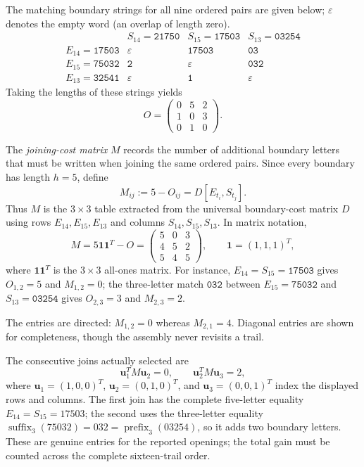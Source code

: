 \documentclass[11pt]{article}
\begin{document}
The matching boundary strings for all nine ordered pairs are given
below; $\varepsilon$ denotes the empty word (an overlap of length zero).
\[
\begin{array}{c|ccc}
  & S_{14}=\texttt{21750} & S_{15}=\texttt{17503} & S_{13}=\texttt{03254}\\\hline
E_{14}=\texttt{17503}&\varepsilon&\texttt{17503}&\texttt{03}\\
E_{15}=\texttt{75032}&\texttt{2}&\varepsilon&\texttt{032}\\
E_{13}=\texttt{32541}&\varepsilon&\texttt{1}&\varepsilon
\end{array}
\]
Taking the lengths of these strings yields
\[
O=\begin{pmatrix}0&5&2\\1&0&3\\0&1&0\end{pmatrix}.
\]

The \emph{joining-cost matrix} $M$ records the number of additional
boundary letters that must be written when joining the same ordered
pairs. Since every boundary has length $h=5$, define
\[
\boxed{M_{ij}:=5-O_{ij}=D[E_{t_i},S_{t_j}].}
\]
Thus $M$ is the $3\times3$ table extracted from the universal
boundary-cost matrix $D$ using rows $E_{14},E_{15},E_{13}$ and columns
$S_{14},S_{15},S_{13}$. In matrix notation,
\[
M=5\mathbf1\mathbf1^T-O
 =\begin{pmatrix}5&\boxed{0}&3\\4&5&\boxed{2}\\5&4&5\end{pmatrix},
\qquad\mathbf1=(1,1,1)^T,
\]
where $\mathbf1\mathbf1^T$ is the $3\times3$ all-ones matrix.
For instance, $E_{14}=S_{15}=\texttt{17503}$ gives $O_{1,2}=5$
and $M_{1,2}=0$; the three-letter match $\texttt{032}$ between
$E_{15}=\texttt{75032}$ and $S_{13}=\texttt{03254}$ gives
$O_{2,3}=3$ and $M_{2,3}=2$.

The entries are directed: $M_{1,2}=0$ whereas $M_{2,1}=4$.
Diagonal entries are shown for completeness, though the assembly
never revisits a trail.

The consecutive joins actually selected are
\[
\mathbf u_1^T M\mathbf u_2=0,
\qquad \mathbf u_2^T M\mathbf u_3=2,
\]
where \(\mathbf u_1=(1,0,0)^T\), \(\mathbf u_2=(0,1,0)^T\),
and \(\mathbf u_3=(0,0,1)^T\) index the displayed rows and columns.
The first join has the complete five-letter equality
\(E_{14}=S_{15}=17503\); the second uses the three-letter equality
\(\operatorname{suffix}_3(75032)=032
 =\operatorname{prefix}_3(03254)\), so it adds two boundary letters.
These are genuine entries for the reported openings; the total gain must
be counted across the complete sixteen-trail order.
\end{document}
